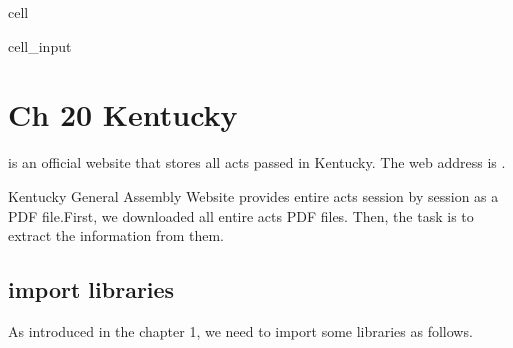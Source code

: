 \documentclass[letterpaper,10pt,english]{jupyterBook}
\begin{document}
\begin{sphinxuseclass}{cell}
\begin{sphinxVerbatimInput}
\begin{sphinxuseclass}{cell_input}
\begin{sphinxVerbatim}[commandchars=\\\{\}]
\end{sphinxVerbatim}

\end{sphinxuseclass}\end{sphinxVerbatimInput}

\end{sphinxuseclass}
\sphinxstepscope


\chapter{Ch 20 Kentucky}
\label{\detokenize{ch20:ch-20-kentucky}}\label{\detokenize{ch20::doc}}
\sphinxAtStartPar
{} is an official website that stores all acts passed in Kentucky. The web address is .

\sphinxAtStartPar
{}

\sphinxAtStartPar
Kentucky General Assembly Website provides entire acts session by session as a PDF file.First, we downloaded all entire acts PDF files. Then, the task is to extract the information from them.

\sphinxAtStartPar
{}


\section{import libraries}
\label{\detokenize{ch20:import-libraries}}
\sphinxAtStartPar
As introduced in the chapter 1, we need to import some libraries as follows.
\end{document}
